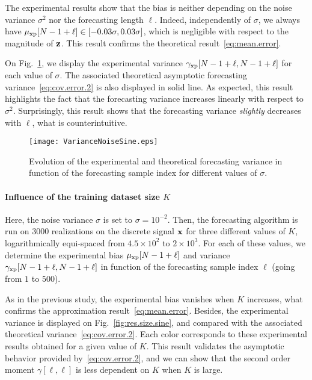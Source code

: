 The experimental results show that the bias is neither depending on the noise variance $\sigma^2$ nor the forecasting length $\ell$. Indeed, independently of $\sigma$, we always have $\mu_{{\mathrm{xp}}}[N-1+\ell]\in\left[-0.03\sigma,0.03\sigma\right]$, which is negligible with respect to the magnitude of ${\mathbf z}$. This result confirms the theoretical result~\eqref{eq:mean.error}. 

On Fig.~\ref{fig:res.noise.sine}, we display the experimental variance $\gamma_{{\mathrm{xp}}}[N-1+\ell,N-1+\ell]$ for each value of $\sigma$. The associated theoretical asymptotic forecasting variance~\eqref{eq:cov.error.2} is also displayed in solid line. As expected, this result highlights the fact that the forecasting variance increases linearly with respect to $\sigma^2$. Surprisingly, this result shows that the forecasting variance {\em slightly} decreases with $\ell$, what is counterintuitive. 
%

\begin{figure}
\texttt{[image: VarianceNoiseSine.eps]}
\caption{Evolution of the experimental and theoretical forecasting variance in function of the forecasting sample index for different values of $\sigma$.}
\label{fig:res.noise.sine}
\end{figure}

\paragraph{Influence of the training dataset size $K$} Here, the noise variance $\sigma$ is set to $\sigma=10^{-2}$. Then, the forecasting algorithm is run on 3000 realizations on the discrete signal ${\mathbf x}$ for three different values of $K$, logarithmically equi-spaced from $4.5\times 10^{2}$ to $2\times 10^{3}$. For each of these values, we determine the experimental bias $\mu_{{\mathrm{xp}}}[N-1+\ell]$ and variance $\gamma_{{\mathrm{xp}}}[N-1+\ell,N-1+\ell]$ in function of the forecasting sample index $\ell$ (going from $1$ to $500$). 

As in the previous study, the experimental bias vanishes when $K$ increases, what confirms the approximation result~\eqref{eq:mean.error}. Besides, the experimental variance  is displayed on Fig.~\ref{fig:res.size.sine}, and compared with the associated theoretical variance~\eqref{eq:cov.error.2}. Each color corresponds to these experimental results obtained for a given value of $K$. This result validates the asymptotic behavior provided by~\eqref{eq:cov.error.2}, and we can show that the second order moment $\gamma[\ell,\ell]$ is less dependent on $K$ when $K$ is large.


